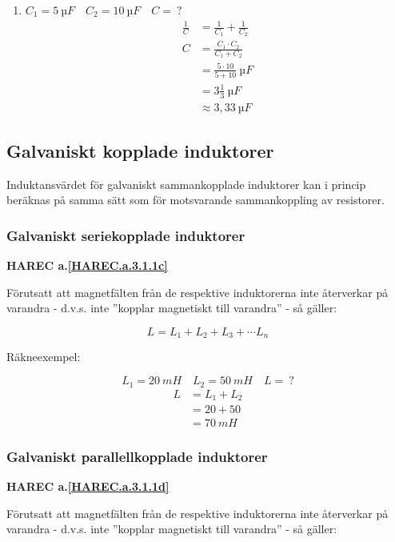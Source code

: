 \begin{enumerate}
  \item \(C_1 = 5\ µF \quad C_2 = 10\ µF \quad C =\ ?\)
    \begin{align*}
      \frac{1}{C} &= \frac{1}{C_1} + \frac{1}{C_2} \\
      C &= \frac{C_1 \cdot C_2}{C_1 + C_2} \\
      &= \frac{5 \cdot 10}{5 + 10}\ µF \\
      &= 3\frac{1}{3}\ µF \\
      &\approx 3,33\ µF
    \end{align*}
\end{enumerate}

\subsection{Galvaniskt kopplade induktorer}

Induktansvärdet för galvaniskt sammankopplade induktorer kan i princip
beräknas på samma sätt som för motsvarande sammankoppling av resistorer.

\subsubsection{Galvaniskt seriekopplade induktorer}
\textbf{HAREC a.\ref{HAREC.a.3.1.1c}\label{myHAREC.a.3.1.1c}}

Förutsatt att magnetfälten från de respektive induktorerna inte återverkar på
varandra - d.v.s. inte ''kopplar magnetiskt till varandra'' - så gäller:

\[L = L_1 + L_2 + L_3 + \cdots L_n\]

Räkneexempel:

\[L_1 = 20\ mH \quad L_2 = 50\ mH \quad L =\ ?\]
\begin{align*}
  L &= L_1 + L_2 \\
  & = 20 + 50 \\
  &= 70\ mH
\end{align*}

\subsubsection{Galvaniskt parallellkopplade induktorer}
\textbf{HAREC a.\ref{HAREC.a.3.1.1d}\label{myHAREC.a.3.1.1d}}

Förutsatt att magnetfälten från de respektive induktorerna inte återverkar på
varandra - d.v.s. inte ''kopplar magnetiskt till varandra'' - så gäller:

